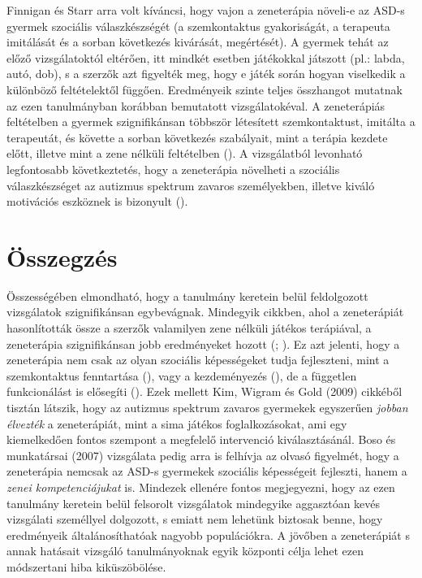 Finnigan és Starr arra volt kíváncsi, hogy vajon a zeneterápia növeli-e az ASD-s gyermek szociális válaszkészségét (a szemkontaktus gyakoriságát, a terapeuta imitálá\-sát és a sorban  következés kivárását, megértését). A gyermek tehát az előző vizsgála\-toktól eltérően, itt mindkét esetben játékokkal játszott (pl.: labda, autó, dob), s a szerzők azt figyelték meg, hogy e játék során hogyan viselkedik a különböző feltételektől függően. Eredményeik szinte teljes összhangot mutatnak az ezen tanulmányban korábban bemutatott vizsgálatokéval. A zeneterápiás feltételben a gyermek szignifikánsan többször létesí\-tett szemkontaktust, imitálta a terapeutát, és követte a sorban következés szabályait, mint a terápia kezdete előtt, illetve mint a zene nélküli feltételben (\cite{finnigan_starr_2010}). A vizsgálatból levonható legfontosabb következtetés, hogy a zeneterápia növelheti a szociális válaszkészséget az autizmus spektrum zavaros személyekben, illetve kiváló motivációs eszköznek is bizonyult (\cite{finnigan_starr_2010}).

\section*{Összegzés}

Összességében elmondható, hogy a tanulmány keretein belül feldolgozott vizsgálatok szignifikánsan egybevágnak. Mindegyik cikkben, ahol a zeneterápiát hasonlították össze a szerzők valamilyen zene nélküli játékos terápiával, a zeneterápia szignifikánsan jobb eredményeket hozott (\cite{finnigan_starr_2010}; \cite{kim_wigram_gold_2009}). Ez azt jelenti, hogy a zeneterápia nem csak az olyan szociális képességeket  tudja fejleszteni, mint a szemkontaktus fenntartása (\cite{finnigan_starr_2010}), vagy a kezdeményezés (\cite{kim_wigram_gold_2009}), de a független funkcionálást is elősegíti (\cite{kern_wolery_aldridge_2006}). Ezek mellett Kim, Wigram és Gold (2009) cikkéből tisztán látszik, hogy az autizmus spektrum zavaros gyermekek egyszerűen \textit{jobban élvezték} a zeneterápiát, mint a sima játékos foglalkozásokat, ami egy kiemelkedően fontos szempont a megfelelő intervenció kiválasztásánál. Boso és munkatársai (2007) vizsgálata pedig arra is felhívja az olvasó figyelmét, hogy a zeneterápia nemcsak az ASD-s gyermekek szociális képességeit fejleszti, hanem a \textit{zenei kompetenciájukat} is. Mindezek ellenére fontos megjegyezni, hogy az ezen tanulmány keretein belül felsorolt vizsgálatok mindegyike aggasztóan kevés vizsgálati személlyel dolgozott, s emiatt nem lehetünk biztosak benne, hogy eredményeik általánosíthatóak nagyobb populációkra. A jövőben a zeneterápiát s annak hatásait vizsgáló tanulmányoknak egyik központi célja lehet ezen módszertani hiba kiküszöbölése.